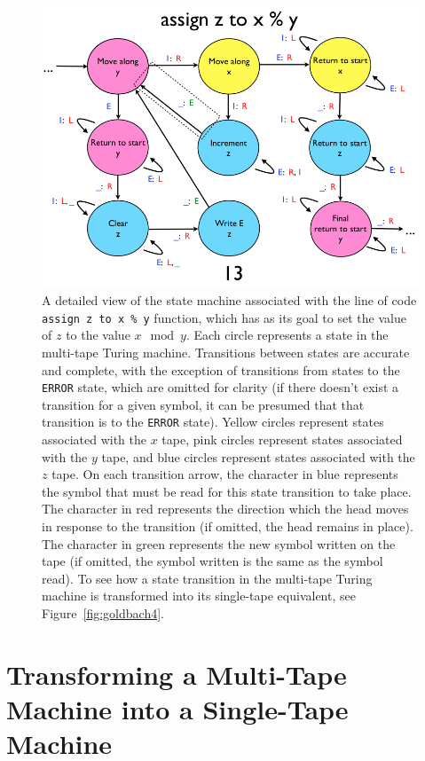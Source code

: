\documentclass[11pt]{report}
\begin{document}
\begin{figure} 
\begin{center} 
\includegraphics[scale=0.4]{figs/goldbach3.png} 
\caption{A detailed view of the state machine associated with the line of code \texttt{assign z to x \% y} function, which has as its goal to set the value of $z$ to the value $x \mod y$. Each circle represents a state in the multi-tape Turing machine. Transitions between states are accurate and complete, with the exception of transitions from states to the \texttt{ERROR} state, which are omitted for clarity (if there doesn't exist a transition for a given symbol, it can be presumed that that transition is to the \texttt{ERROR} state). Yellow circles represent states associated with the $x$ tape, pink circles represent states associated with the $y$ tape, and blue circles represent states associated with the $z$ tape. On each transition arrow, the character in blue represents the symbol that must be read for this state transition to take place. The character in red represents the direction which the head moves in response to the transition (if omitted, the head remains in place). The character in green represents the new symbol written on the tape (if omitted, the symbol written is the same as the symbol read). To see how a state transition in the multi-tape Turing machine is transformed into its single-tape equivalent, see Figure~\ref{fig:goldbach4}. \label{fig:goldbach3}}
\end{center} 
\end{figure}

\section{Transforming a Multi-Tape Machine into a Single-Tape Machine \label{sec:mttostgoldbach}}
\end{document}
